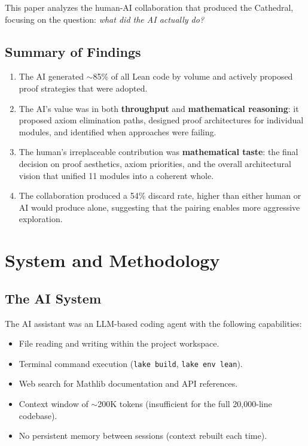 \documentclass[11pt,a4paper]{article}
\newcommand{\lean}[1]{\texttt{#1}}
\begin{document}
This paper analyzes the human-AI collaboration that produced the
Cathedral, focusing on the question: \emph{what did the AI actually
do?}

\subsection{Summary of Findings}

\begin{enumerate}
  \item The AI generated $\sim$85\% of all Lean code by volume and
    actively proposed proof strategies that were adopted.
  \item The AI's value was in both \textbf{throughput} and
    \textbf{mathematical reasoning}: it proposed axiom elimination
    paths, designed proof architectures for individual modules, and
    identified when approaches were failing.
  \item The human's irreplaceable contribution was
    \textbf{mathematical taste}: the final decision on proof
    aesthetics, axiom priorities, and the overall architectural
    vision that unified 11 modules into a coherent whole.
  \item The collaboration produced a 54\% discard rate, higher than
    either human or AI would produce alone, suggesting that the
    pairing enables more aggressive exploration.
\end{enumerate}

\section{System and Methodology}
\label{sec:system}

\subsection{The AI System}

The AI assistant was an LLM-based coding agent with the following
capabilities:

\begin{itemize}
  \item File reading and writing within the project workspace.
  \item Terminal command execution (\lean{lake build}, \lean{lake env lean}).
  \item Web search for Mathlib documentation and API references.
  \item Context window of $\sim$200K tokens (insufficient for the
    full 20,000-line codebase).
  \item No persistent memory between sessions (context rebuilt each
    time).
\end{itemize}
\end{document}

